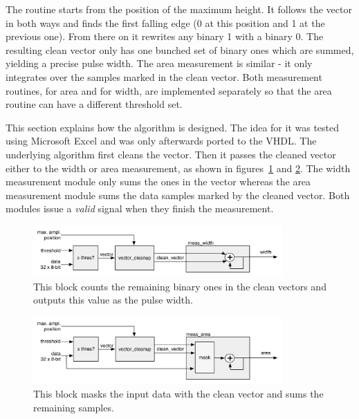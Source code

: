 The routine starts from the position of the maximum height. It follows the vector in both ways and finds the first falling edge (0 at this position and 1 at the previous one). From there on it rewrites any binary 1 with a binary 0. The resulting clean vector only has one bunched set of binary ones which are summed, yielding a precise pulse width. The area measurement is similar - it only integrates over the samples marked in the clean vector. Both measurement routines, for area and for width, are implemented separately so that the area routine can have a different threshold set.

This section explains how the algorithm is designed. The idea for it was tested using Microsoft Excel and was only afterwards ported to the VHDL. The underlying algorithm first cleans the vector. Then it passes the cleaned vector either to the width or area measurement, as shown in figures~\ref{fig:width} and \ref{fig:area}. The width measurement module only sums the ones in the vector whereas the area measurement module sums the data samples marked by the cleaned vector. Both modules issue a \emph{valid} signal when they finish the measurement.

\begin{figure}[!t]
\centering
\includegraphics[width=0.85\textwidth]{05_current_monitoring/plots/width2}
\caption{This block counts the remaining binary ones in the clean vectors and outputs this value as the pulse width.}
\label{fig:width}
\end{figure}


\begin{figure}[!t]
\centering\includegraphics[width=0.85\textwidth]{05_current_monitoring/plots/area2}
\caption{This block masks the input data with the clean vector and sums the remaining samples.}
\label{fig:area}
\end{figure}


